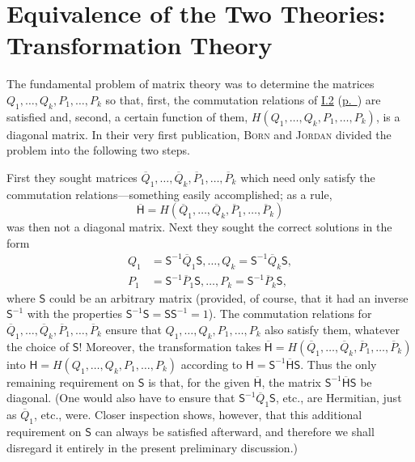 \documentclass[fontsize=13pt,twoside,openany,headings=normal,parskip=false,bookmarkpackage=false,DIV=calc]{scrbook}
\begin{document}
\section{Equivalence of the Two Theories: Transformation Theory}\label{sec:I.3}
The fundamental problem of matrix theory was to determine the matrices $Q_1,\ldots,Q_k,P_1,\ldots,P_k$ so that, first, the commutation relations of \hyperref[sec:I.2]{I.2} (\hyperref[rel:I.2.commutation]{p.~\pageref*{rel:I.2.commutation}}) are satisfied and, second, a certain function of them, $H(Q_1,\ldots,Q_k,P_1,\ldots,P_k)$, is a diagonal matrix. In their very first publication, \textsc{Born} and \textsc{Jordan} divided the problem into the following two steps.

First they sought matrices $\overline Q_1,\ldots,\overline Q_k,\overline P_1,\ldots,\overline P_k$ which need only satisfy the commutation relations---something easily accomplished; as a rule,
\[
 \overline{\mathsf{H}}=H(\overline Q_1,\ldots,\overline Q_k,\overline P_1,\ldots,\overline P_k)
\]
was then not a diagonal matrix. Next they sought the correct solutions in the form
\begin{align*}
 Q_1&=\mathsf{S}^{-1}\overline Q_1\mathsf{S},\ldots,Q_k=\mathsf{S}^{-1}\overline Q_k\mathsf{S},\\
 P_1&=\mathsf{S}^{-1}\overline P_1\mathsf{S},\ldots,P_k=\mathsf{S}^{-1}\overline P_k\mathsf{S},
\end{align*}
where $\mathsf{S}$ could be an arbitrary matrix (provided, of course, that it had an inverse $\mathsf{S}^{-1}$ with the properties $\mathsf{S}^{-1}\mathsf{S}=\mathsf{S}\mathsf{S}^{-1}=1$). The commutation relations for $\overline Q_1,\ldots,\overline Q_k,\overline P_1,\ldots,\overline P_k$ ensure that $Q_1,\ldots,Q_k,P_1,\ldots,P_k$ also satisfy them, whatever the choice of $\mathsf{S}$! Moreover, the transformation takes $\overline{\mathsf{H}}=H(\overline Q_1,\ldots,\overline Q_k,\overline P_1,\ldots,\overline P_k)$ into $\mathsf{H}=H(Q_1,\ldots,Q_k,P_1,\ldots,P_k)$ according to $\mathsf{H}=\mathsf{S}^{-1}\overline{\mathsf{H}}\mathsf{S}$. Thus the only remaining requirement on $\mathsf{S}$ is that, for the given $\overline{\mathsf{H}}$, the matrix $\mathsf{S}^{-1}\overline{\mathsf{H}}\mathsf{S}$ be diagonal. (One would also have to ensure that $\mathsf{S}^{-1}\overline Q_1\mathsf{S}$, etc., are Hermitian, just as $\overline Q_1$, etc., were. Closer inspection shows, however, that this additional requirement on $\mathsf{S}$ can always be satisfied afterward, and therefore we shall disregard it entirely in the present preliminary discussion.)
\end{document}
